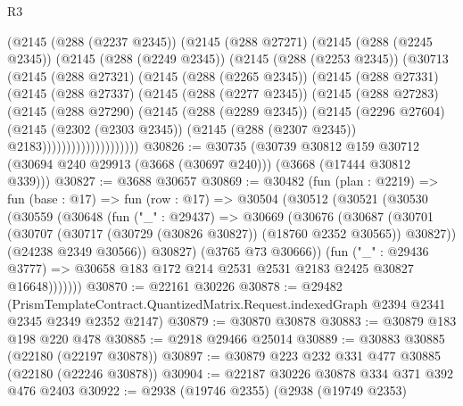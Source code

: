 \begin{lexlean}{R3}
\begin{coremodule}
          (@2145
            (@288 (@2237 @2345))
            (@2145
              (@288 @27271)
              (@2145
                (@288 (@2245 @2345))
                (@2145
                  (@288 (@2249 @2345))
                  (@2145
                    (@288 (@2253 @2345))
                    (@30713
                      (@2145
                        (@288 @27321)
                        (@2145
                          (@288 (@2265 @2345))
                          (@2145
                            (@288 @27331)
                            (@2145
                              (@288 @27337)
                              (@2145
                                (@288 (@2277 @2345))
                                (@2145
                                  (@288 @27283)
                                  (@2145
                                    (@288 @27290)
                                    (@2145
                                      (@288 (@2289 @2345))
                                      (@2145
                                        (@2296 @27604)
                                        (@2145
                                          (@2302 (@2303 @2345))
                                          (@2145 (@288 (@2307 @2345)) @2183))))))))))))))))))))
@30826 := @30735
    (@30739
      @30812
      @159
      @30712
      (@30694 @240 @29913 (@3668 (@30697 @240)))
      (@3668 (@17444 @30812 @339)))
@30827 := @3688 @30657
@30869 := @30482
    (fun (plan : @2219) =>
    fun (base : @17) =>
    fun (row : @17) =>
    @30504
      (@30512
        (@30521
          (@30530
            (@30559
              (@30648
                (fun ("_" : @29437) =>
                @30669
                  (@30676
                    (@30687
                      (@30701
                        (@30707 (@30717 (@30729 (@30826 @30827)) (@18760 @2352 @30565)) @30827))
                      (@24238 @2349 @30566))
                    @30827)
                  (@3765 @73 @30666))
                (fun ("_" : @29436 @3777) =>
                @30658 @183 @172 @214 @2531 @2531 @2183 @2425 @30827 @16648)))))))
@30870 := @22161 @30226
@30878 := @29482
    (PrismTemplateContract.QuantizedMatrix.Request.indexedGraph @2394 @2341 @2345 @2349 @2352 @2147)
@30879 := @30870 @30878
@30883 := @30879 @183 @198 @220 @478
@30885 := @2918 @29466 @25014
@30889 := @30883 @30885 (@22180 (@22197 @30878))
@30897 := @30879 @223 @232 @331 @477 @30885 (@22180 (@22246 @30878))
@30904 := @22187 @30226 @30878 @334 @371 @392 @476 @2403
@30922 := @2938
    (@19746 @2355)
    (@2938
      (@19749 @2353)

\end{coremodule}
\end{lexlean}
